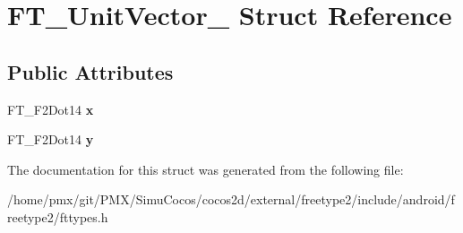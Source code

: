\hypertarget{structFT__UnitVector__}{}\section{F\+T\+\_\+\+Unit\+Vector\+\_\+ Struct Reference}
\label{structFT__UnitVector__}
\subsection*{Public Attributes}
\begin{DoxyCompactItemize}
\item 
\mbox{\label{structFT__UnitVector___a03c9f8ae35a5ad1bcac49995a9dac714}} 
F\+T\+\_\+\+F2\+Dot14 {\bfseries x}
\item 
\mbox{\label{structFT__UnitVector___a12eb9ad5c47614f5f2d3f9e401933d0e}} 
F\+T\+\_\+\+F2\+Dot14 {\bfseries y}
\end{DoxyCompactItemize}


The documentation for this struct was generated from the following file\+:\begin{DoxyCompactItemize}
\item 
/home/pmx/git/\+P\+M\+X/\+Simu\+Cocos/cocos2d/external/freetype2/include/android/freetype2/fttypes.\+h\end{DoxyCompactItemize}
